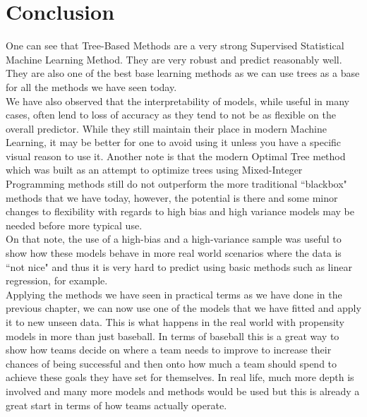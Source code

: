\documentclass[11pt,a4paper]{report}
\begin{document}
\chapter{Conclusion}
One can see that Tree-Based Methods are a very strong Supervised Statistical Machine Learning Method. 
They are very robust and predict reasonably well.
They are also one of the best base learning methods as we can use trees as a base for all the methods we have seen today.
\medskip\\
We have also observed that the interpretability of models, while useful in many cases, often lend to loss of accuracy as they tend to not be as flexible on the overall predictor. 
While they still maintain their place in modern Machine Learning, it may be better for one to avoid using it unless you have a specific visual reason to use it.
Another note is that the modern Optimal Tree method which was built as an attempt to optimize trees using Mixed-Integer Programming methods still do not outperform the more traditional ``blackbox" methods that we have today, however, the potential is there and some minor changes to flexibility with regards to high bias and high variance models may be needed before more typical use.
\medskip\\
On that note, the use of a high-bias and a high-variance sample was useful to show how these models behave in more real world scenarios where the data is ``not nice" and thus it is very hard to predict using basic methods such as linear regression, for example. 
\bigskip\\
Applying the methods we have seen in practical terms as we have done in the previous chapter, we can now use one of the models that we have fitted and apply it to new unseen data.
This is what happens in the real world with propensity models in more than just baseball.
In terms of baseball this is a great way to show how teams decide on where a team needs to improve to increase their chances of being successful and then onto how much a team should spend to achieve these goals they have set for themselves.
In real life, much more depth is involved and many more models and methods would be used but this is already a great start in terms of how teams actually operate.
\end{document}
